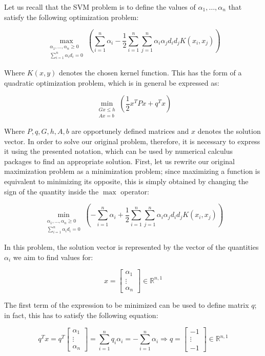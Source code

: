 \documentclass[letterpaper,headings=standardclasses]{scrartcl}
\begin{document}
Let us recall that the SVM problem is to define the values of $\alpha_1, \dots, \alpha_n$ that satisfy the following optimization problem:

$$ \max_{\substack{\alpha_1, \dots, \alpha_n \ge 0 \\ \scriptstyle \sum_{i = 1}^n \alpha_i d_i = 0}}{\left( \sum_{i = 1}^n \alpha_i - \frac{1}{2} \sum_{i = 1}^n \sum_{j = 1}^n \alpha_i \alpha_j d_i d_j K(x_i, x_j) \right)} $$

Where $K(x,y)$ denotes the chosen kernel function. This has the form of a quadratic optimization problem, which is in general be expressed as:

$$ \min_{\substack{Gx \le h \\ \scriptstyle Ax = b}}{\left( \frac{1}{2} x^T P x + q^T x \right)} $$

Where $P, q, G, h, A, b$ are opportunely defined matrices and $x$ denotes the solution vector. In order to solve our original problem, therefore, it is necessary to express it using the presented notation, which can be used by numerical calculus packages to find an appropriate solution. First, let us rewrite our original maximization problem as a minimization problem; since maximizing a function is equivalent to minimizing its opposite, this is simply obtained by changing the sign of the quantity inside the $\max$ operator:

$$ \min_{\substack{\alpha_1, \dots, \alpha_n \ge 0 \\ \scriptstyle \sum_{i = 1}^n \alpha_i d_i = 0}}{\left( - \sum_{i = 1}^n \alpha_i + \frac{1}{2} \sum_{i = 1}^n \sum_{j = 1}^n \alpha_i \alpha_j d_i d_j K(x_i, x_j) \right)} $$

In this problem, the solution vector is represented by the vector of the quantities $\alpha_i$ we aim to find values for:

$$ x = \left[ \begin{matrix} \alpha_1 \\ \vdots \\ \alpha_n \end{matrix} \right] \in \mathbb{R}^{n,1} $$

The first term of the expression to be minimized can be used to define matrix $q$; in fact, this has to satisfy the following equation:

$$ q^T x = q^T \left[ \begin{matrix} \alpha_1 \\ \vdots \\ \alpha_n \end{matrix} \right] = \sum_{i = 1}^n q_i \alpha_i = - \sum_{i = 1}^n \alpha_i \Rightarrow q = \left[ \begin{matrix} -1 \\ \vdots \\ -1 \end{matrix} \right] \in \mathbb{R}^{n,1} $$
\end{document}
